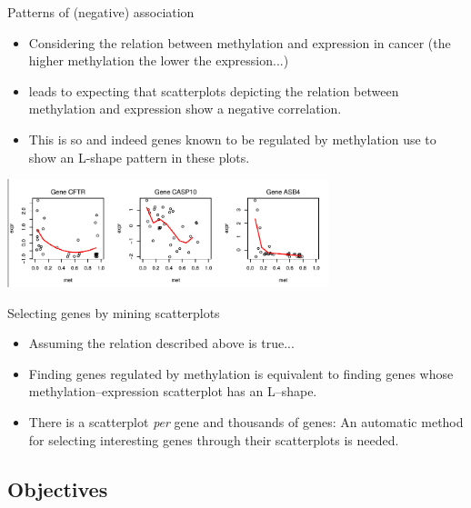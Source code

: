 \documentclass[handout]{beamer}
\begin{document}
\begin{frame}{Patterns of (negative) association}
  \begin{itemize}
  \item Considering the relation between methylation and expression in cancer (the higher methylation the lower the expression...)
\item leads to expecting that scatterplots depicting the relation between methylation and expression show a negative correlation.
\item This is so and indeed genes known to be regulated by methylation use to show an L-shape pattern in these plots.
  \end{itemize}
\begin{center}
\includegraphics[width=0.7\textwidth]{./images/Lshapes1.png}
\end{center}
\end{frame}

\begin{frame}{Selecting genes by mining scatterplots}
  \begin{itemize}
  \item Assuming the relation described above is true...
\item Finding genes regulated by methylation is equivalent to finding genes whose methylation--expression scatterplot has an L--shape.
\item There is a scatterplot \emph{per} gene and thousands of genes: An automatic method for selecting interesting genes through their scatterplots is needed.
  \end{itemize}
\end{frame}


\subsection{Objectives}
\end{document}
